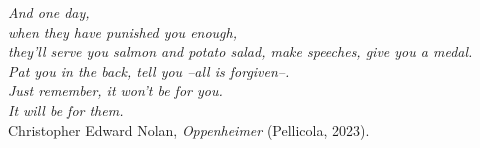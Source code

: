 \thispagestyle{empty}
\begin{flushright}
    \emph{And one day,\\
    when they have punished you enough,\\
    they'll serve you salmon and potato salad, make speeches, give you a medal.\\
    Pat you in the back, tell you --all is forgiven--. \\
    Just remember, it won't be for you.\\ It will be for them.\\}
    \vspace{1cm}
    Christopher Edward Nolan, \emph{Oppenheimer} (Pellicola, 2023).
\end{flushright}
